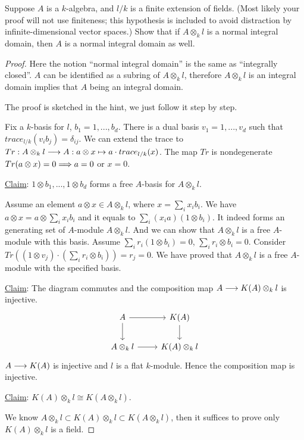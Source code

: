\begin{exr}
Suppose $A$ is a $k$-algebra, and $l/k$ is a finite extension of fields. (Most likely your proof will not use finiteness; this hypothesis is included to avoid distraction by infinite-dimensional vector spaces.) Show that if $A\otimes_k l$ is a normal integral domain, then $A$ is a normal integral domain as well.
\end{exr}
\begin{proof}
Here the notion ``normal integral domain'' is the same as ``integrally closed''. $A$ can be identified as a subring of $A\otimes_k l$, therefore $A\otimes_k l$ is an integral domain implies that $A$ being an integral domain. 

The proof is sketched in the hint, we just follow it step by step.

 Fix a $k$-basis for $l$, $b_1=1,...,b_d$. There is a dual basis $v_1=1,...,v_d$ such that $trace_{l/k}(v_i b_j)=\delta_{ij}$. We can extend the trace to $Tr:A\otimes_k l\longrightarrow A: a\otimes x\mapsto a\cdot trace_{l/k}(x)$. The map $Tr$ is nondegenerate $Tr(a\otimes x)=0\Longrightarrow a=0$ or $x=0$.

 \underline{Claim}: $1\otimes b_1,...,1\otimes b_d$ forms a free $A$-basis for $A\otimes_k l$. 

 Assume an element $a\otimes x\in A\otimes_k l$, where $x=\sum_i x_i b_i$. We have 
 $a\otimes x=a\otimes \sum_i x_i b_i$ and it equals to $\sum_i (x_i a) (1\otimes b_i)$. It indeed forms an generating set of  $A$-module $A\otimes_k l$. And we can show that $A\otimes_k l$ is a free $A$-module with this basis. Assume $\sum_i r_i(1\otimes b_i)=0$, $\sum_i r_i\otimes b_i=0$. Consider $Tr((1\otimes v_j)\cdot (\sum_i r_i\otimes b_i))=r_j=0$. We have proved that $A\otimes_k l$ is a free $A$-module with the specified basis.

 \underline{Claim}: The diagram commutes and the composition map $A\longrightarrow K(A)\otimes_k l$ is injective.
\[
\begin{tikzcd}
A \arrow[r] \arrow[d] & K(A) \arrow[d] \\
A\otimes_k l \arrow[r] & K(A)\otimes_k l
\end{tikzcd}
\]
$A\longrightarrow K(A)$ is injective and $l$ is a flat $k$-module. Hence the composition map is injective.

\underline{Claim}: $K(A)\otimes_k l\cong K(A\otimes_k  l)$.

We know $A\otimes_k l\subset K(A)\otimes_k l\subset K(A\otimes_k l)$, then it suffices to prove only $K(A)\otimes_k l$ is a field.


\end{proof}
